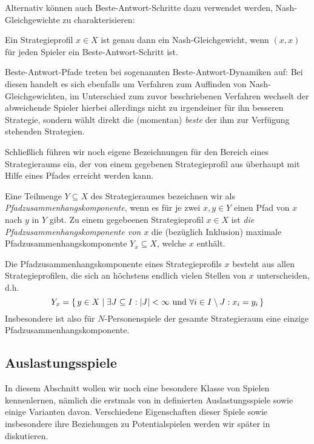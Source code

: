 Alternativ können auch Beste-Antwort-Schritte dazu verwendet werden, Nash-Gleichgewichte zu charakterisieren:

\begin{beob}\label{beob:BASchritteNG}
	Ein Strategieprofil $x \in X$ ist genau dann ein Nash-Gleichgewicht, wenn $(x,x)$ für jeden Spieler ein Beste-Antwort-Schritt ist.
\end{beob}

Beste-Antwort-Pfade treten bei sogenannten Beste-Antwort-Dynamiken auf: Bei diesen handelt es sich ebenfalls um Verfahren zum Auffinden von Nash-Gleichgewichten, im Unterschied zum zuvor beschriebenen Verfahren wechselt der abweichende Spieler hierbei allerdings nicht zu irgendeiner für ihn besseren Strategie, sondern wählt direkt die (momentan) \emph{beste} der ihm zur Verfügung stehenden Strategien. 

Schließlich führen wir noch eigene Bezeichnungen für den Bereich eines Strategieraums ein, der von einem gegebenen Strategieprofil aus überhaupt mit Hilfe eines Pfades erreicht werden kann. 

\begin{defn}
	Eine Teilmenge $Y \subseteq X$ des Strategieraumes bezeichnen wir als \emph{Pfadzusammenhangskomponente}, wenn es für je zwei $x, y \in Y$ einen Pfad von $x$ nach $y$ in $Y$ gibt. Zu einem gegebeenen Strategieprofil $x \in X$ ist \emph{die Pfadzusammenhangskomponente von $x$} die (bezüglich Inklusion) maximale Pfadzusammenhangskomponente $Y_x \subseteq X$, welche $x$ enthält.
\end{defn}

\begin{beob}\label{beob:NPersSpieleNureinePfadzshkomp}
	Die Pfadzusammenhangskomponente eines Strategieprofils $x$ besteht aus allen Strategieprofilen, die sich an höchstens endlich vielen Stellen von $x$ unterscheiden, d.h.
	\[Y_x = \set{y \in X | \exists J \subseteq I: \left|J\right| < \infty \text{ und } \forall i \in I\setminus J: x_i = y_i } \]
	Insbesondere ist also für $N$-Personenspiele der gesamte Strategieraum eine einzige Pfadzusammenhangskomponente.
\end{beob}


\subsection{Auslastungsspiele}

In diesem Abschnitt wollen wir noch eine besondere Klasse von Spielen kennenlernen, nämlich die erstmals von \citeauthor{RosenthalPotential} in \cite{RosenthalPotential} definierten Auslastungsspiele sowie einige Varianten davon. Verschiedene Eigenschaften dieser Spiele sowie insbesondere ihre Beziehungen zu Potentialspielen werden wir später in  diskutieren.

